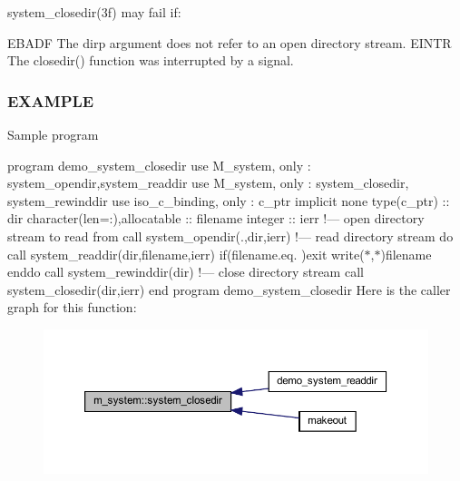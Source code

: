 system\+\_\+closedir(3f) may fail if\+:

E\+B\+A\+DF The dirp argument does not refer to an open directory stream. E\+I\+N\+TR The closedir() function was interrupted by a signal. \subsubsection*{E\+X\+A\+M\+P\+LE}

Sample program

program demo\+\_\+system\+\_\+closedir use M\+\_\+system, only \+: system\+\_\+opendir,system\+\_\+readdir use M\+\_\+system, only \+: system\+\_\+closedir, system\+\_\+rewinddir use iso\+\_\+c\+\_\+binding, only \+: c\+\_\+ptr implicit none type(c\+\_\+ptr) \+:\+: dir character(len=\+:),allocatable \+:\+: filename integer \+:\+: ierr !--- open directory stream to read from call system\+\_\+opendir(\textquotesingle{}.\textquotesingle{},dir,ierr) !--- read directory stream do call system\+\_\+readdir(dir,filename,ierr) if(filename.\+eq.\textquotesingle{} \textquotesingle{})exit write($\ast$,$\ast$)filename enddo call system\+\_\+rewinddir(dir) !--- close directory stream call system\+\_\+closedir(dir,ierr) end program demo\+\_\+system\+\_\+closedir Here is the caller graph for this function\+:
\nopagebreak
\begin{figure}[H]
\begin{center}
\leavevmode
\includegraphics[width=350pt]{namespacem__system_acd442b52c64fc50482bc08b0ac8a50d1_icgraph}
\end{center}
\end{figure}
\mbox{\label{namespacem__system_a257d2b8987db850bc686507f19ccbe4a}} 
